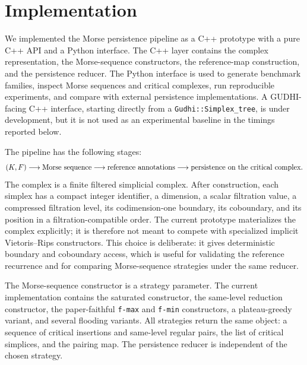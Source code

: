 \providecommand{\ratioiqr}[3]{\shortstack[c]{#1\\[-0.25ex]{\tiny #2--#3}}}

\section{Implementation}
\label{sec:implementation}

We implemented the Morse persistence pipeline as a C++ prototype with a pure C++ API and
a Python interface.  The C++ layer contains the complex representation, the Morse-sequence
constructors, the reference-map construction, and the persistence reducer.  The Python
interface is used to generate benchmark families, inspect Morse sequences and critical
complexes, run reproducible experiments, and compare with external persistence
implementations.  A GUDHI-facing C++ interface, starting directly from a
\texttt{Gudhi::Simplex\_tree}, is under development, but it is not used as an experimental
baseline in the timings reported below.

The pipeline has the following stages:
\[
  (K,F)
  \longrightarrow
  \hbox{Morse sequence}
  \longrightarrow
  \hbox{reference annotations}
  \longrightarrow
  \hbox{persistence on the critical complex}.
\]
The complex is a finite filtered simplicial complex.  After construction, each simplex has
a compact integer identifier, a dimension, a scalar filtration value, a compressed
filtration level, its codimension-one boundary, its coboundary, and its position in a
filtration-compatible order.  The current prototype materializes the complex explicitly;
it is therefore not meant to compete with specialized implicit Vietoris--Rips
constructors.  This choice is deliberate: it gives deterministic boundary and coboundary
access, which is useful for validating the reference recurrence and for comparing
Morse-sequence strategies under the same reducer.

The Morse-sequence constructor is a strategy parameter.  The current implementation
contains the saturated constructor, the same-level reduction constructor, the
paper-faithful \texttt{f-max} and \texttt{f-min} constructors, a plateau-greedy variant,
and several flooding variants.  All strategies return the same object: a sequence of
critical insertions and same-level regular pairs, the list of critical simplices, and the
pairing map.  The persistence reducer is independent of the chosen strategy.

